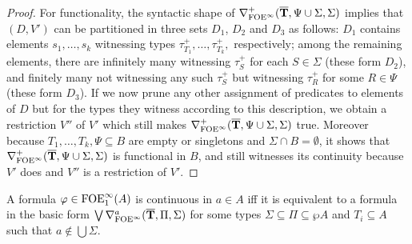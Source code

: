 \begin{proof}
For functionality, the syntactic shape of $\mondbnfofoei{\vlist{T}}{\Psi \cup \Sigma}{ \Sigma}{+}$ implies that $(D,V')$ can be partitioned in three sets $D_1$, $D_2$ and $D_3$ as follows: $D_1$ contains elements $s_1, \dots, s_k$ witnessing types $\tau^+_{T_1},\dots, \tau^+_{T_k},$ respectively; among the remaining elements, there are infinitely many witnessing $\tau^+_S$ for each $S\in \Sigma$ (these form $D_2$), and finitely many not witnessing any such $\tau^+_S$ but witnessing $\tau^+_R$ for some $R \in \Psi$ (these form $D_3$). If we now prune any other assignment of predicates to elements of $D$ but for the types they witness according to this description, we obtain a restriction $V''$ of $V'$ which still makes $\mondbnfofoei{\vlist{T}}{\Psi \cup \Sigma}{ \Sigma}{+}$ true. Moreover because $T_1,\dots,T_k,\Psi \subseteq B$ are empty or singletons and $\Sigma \cap B = \emptyset$, it shows that $\mondbnfofoei{\vlist{T}}{\Psi \cup \Sigma}{ \Sigma}{+}$ is functional in $B$, and still witnesses its continuity because $V'$ does and $V''$ is a restriction of $V'$.  %
\end{proof}

\begin{proposition}
A formula $\varphi  \in \ofoei(A)$ is continuous in $a \in A$ iff it is equivalent to a formula in the basic form $\bigvee \mondbnfofoei{\vlist{T}}{\Pi}{\Sigma}{a}$ for some types $\Sigma\subseteq\Pi \subseteq \wp A$ and $T_i \subseteq A$ such that $a\notin \bigcup\Sigma$.
\end{proposition}
